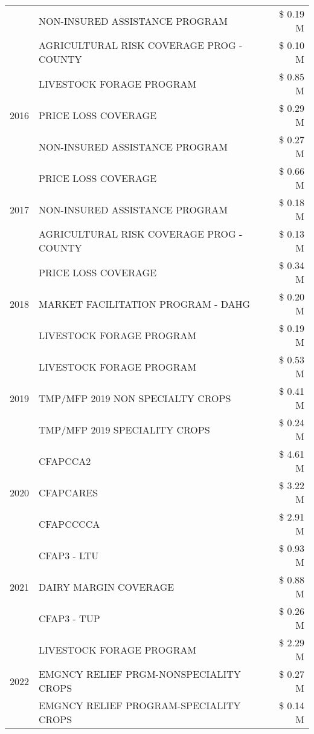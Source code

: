 \begin{tabular}{llr}
 & NON-INSURED ASSISTANCE PROGRAM & \$ 0.19 M \\
 & AGRICULTURAL RISK COVERAGE PROG - COUNTY & \$ 0.10 M \\
\cline{1-3}
\multirow[t]{3}{*}{2016} & LIVESTOCK FORAGE PROGRAM & \$ 0.85 M \\
 & PRICE LOSS COVERAGE & \$ 0.29 M \\
 & NON-INSURED ASSISTANCE PROGRAM & \$ 0.27 M \\
\cline{1-3}
\multirow[t]{3}{*}{2017} & PRICE LOSS COVERAGE & \$ 0.66 M \\
 & NON-INSURED ASSISTANCE PROGRAM & \$ 0.18 M \\
 & AGRICULTURAL RISK COVERAGE PROG - COUNTY & \$ 0.13 M \\
\cline{1-3}
\multirow[t]{3}{*}{2018} & PRICE LOSS COVERAGE & \$ 0.34 M \\
 & MARKET FACILITATION PROGRAM - DAHG & \$ 0.20 M \\
 & LIVESTOCK FORAGE PROGRAM & \$ 0.19 M \\
\cline{1-3}
\multirow[t]{3}{*}{2019} & LIVESTOCK FORAGE PROGRAM & \$ 0.53 M \\
 & TMP/MFP 2019 NON SPECIALTY CROPS & \$ 0.41 M \\
 & TMP/MFP 2019 SPECIALITY CROPS & \$ 0.24 M \\
\cline{1-3}
\multirow[t]{3}{*}{2020} & CFAPCCA2 & \$ 4.61 M \\
 & CFAPCARES & \$ 3.22 M \\
 & CFAPCCCCA & \$ 2.91 M \\
\cline{1-3}
\multirow[t]{3}{*}{2021} & CFAP3 - LTU & \$ 0.93 M \\
 & DAIRY MARGIN COVERAGE & \$ 0.88 M \\
 & CFAP3 - TUP & \$ 0.26 M \\
\cline{1-3}
\multirow[t]{3}{*}{2022} & LIVESTOCK FORAGE PROGRAM & \$ 2.29 M \\
 & EMGNCY RELIEF PRGM-NONSPECIALITY CROPS & \$ 0.27 M \\
 & EMGNCY RELIEF PROGRAM-SPECIALITY CROPS & \$ 0.14 M \\
\cline{1-3}
\bottomrule
\end{tabular}
